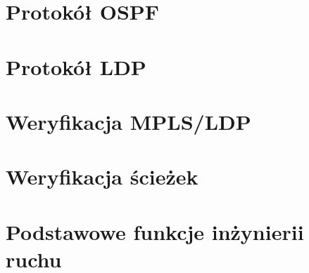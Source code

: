 \documentclass[a4paper,12pt,notitlepage]{article}
\begin{document}
\section{Protokół OSPF}

\section{Protokół LDP}

\section{Weryfikacja MPLS/LDP}

\section{Weryfikacja ścieżek}

\section{Podstawowe funkcje inżynierii ruchu}
\end{document}
